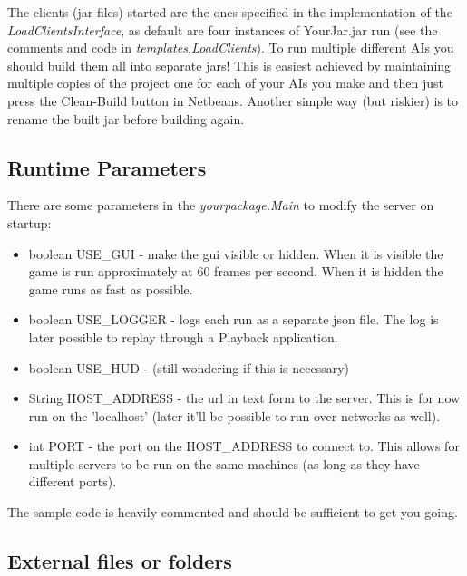 \documentclass[10pt,a4paper]{article}
\begin{document}
The clients (jar files) started are the ones specified in the implementation of the \textit{LoadClientsInterface}, as default are four instances of YourJar.jar run (see the comments and code in \textit{templates.LoadClients}). To run multiple different AIs you should build them all into separate jars! This is easiest achieved by maintaining multiple copies of the project one for each of your AIs you make and then just press the Clean-Build button in Netbeans. Another simple way (but riskier) is to rename the built jar before building again.


\subsection{Runtime Parameters}

There are some parameters in the \textit{yourpackage.Main} to modify the server on startup:
\begin{itemize}

\item boolean USE\_GUI - make the gui visible or hidden. When it is visible the game is run approximately at 60 frames per second. When it is hidden the game runs as fast as possible.

\item boolean USE\_LOGGER - logs each run as a separate json file. The log is later possible to replay through a Playback application.

\item boolean USE\_HUD - (still wondering if this is necessary)

\item String HOST\_ADDRESS - the url in text form to the server. This is for now run on the 'localhost' (later it'll be possible to run over networks as well).

\item int PORT - the port on the HOST\_ADDRESS to connect to. This allows for multiple servers to be run on the same machines (as long as they have different ports).

\end{itemize}

The sample code is heavily commented and should be sufficient to get you going.

\subsection{External files or folders}
\end{document}
